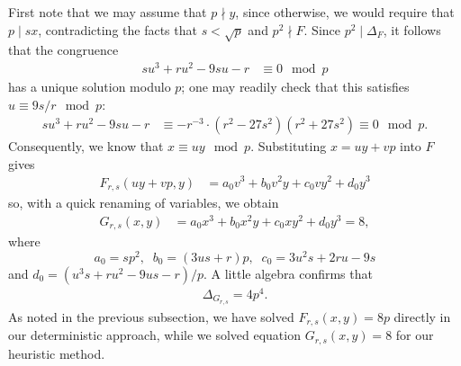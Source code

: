 First note that we may assume that $p \nmid y$, since otherwise, we would require that $p \mid sx$, contradicting the facts that $s < \sqrt{p}$ and $p^2 \nmid F$. Since $p^2 \mid \Delta_F$, it follows that the congruence
\begin{align*}
  su^3 +ru^2 -9su - r &\equiv 0 \mod{p}
\end{align*}
has a unique solution modulo $p$; one may readily check that this satisfies $u \equiv 9s/r \mod{p}$:
\begin{align*}
  su^3 +ru^2 -9su - r &\equiv -r^{-3} \cdot (r^2-27s^2)(r^2+27s^2) \equiv 0 \mod{p}.
\end{align*}
Consequently, we know that $x \equiv uy \mod{p}$. Substituting $x = uy + vp$ into $F$ gives
\begin{align*}
F_{r,s}(uy+vp,y) &= a_0 v^3 + b_0 v^2 y + c_0 v y^2 + d_0 y^3
\end{align*}
so, with a quick renaming of variables, we obtain
\begin{align*}
G_{r,s}(x,y) &= a_0 x^3 + b_0 x^2 y + c_0 x y^2 + d_0 y^3 =8,
\end{align*} 
where
$$
a_0 = s p^2, \; \; b_0 = (3 u s+r) p, \; \; 
c_0 = 3 u^2 s+2 r u - 9s
$$
and $d_0 = (u^3 s+r u^2 - 9 u s - r)/p$. A little algebra confirms that 
\begin{align*}
\Delta_{G_{r,s}} = 4 p^4.
\end{align*}
As noted in the previous subsection, we have solved $F_{r,s}(x,y)=8p$ directly in our deterministic 
approach, while we solved equation $G_{r,s}(x,y)=8$ for our heuristic method.

